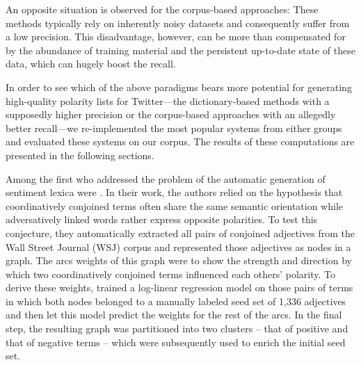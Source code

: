 An opposite situation is observed for the corpus-based approaches:
These methods typically rely on inherently noisy datasets and
consequently suffer from a low precision.  This disadvantage, however,
can be more than compensated for by the abundance of training material
and the persistent up-to-date state of these data, which can hugely
boost the recall.

In order to see which of the above paradigms bears more potential for
generating high-quality polarity lists for Twitter---the
dictionary-based methods with a supposedly higher precision or the
corpus-based approaches with an allegedly better recall---we
re-implemented the most popular systems from either groups and
evaluated these systems on our corpus.  The results of these
computations are presented in the following sections.

Among the first who addressed the problem of the automatic generation
of sentiment lexica were \citet{Hatzivassi:97}.  In their work, the
authors relied on the hypothesis that coordinatively conjoined terms
often share the same semantic orientation while adversatively linked
words rather express opposite polarities.  To test this conjecture,
they automatically extracted all pairs of conjoined adjectives from
the Wall Street Journal (WSJ) corpus and represented those adjectives
as nodes in a graph.  The arcs weights of this graph were to show the
strength and direction by which two coordinatively conjoined terms
influenced each others' polarity.  To derive these weights,
\citeauthor{Hatzivassi:97} trained a log-linear regression model on
those pairs of terms in which both nodes belonged to a manually
labeled seed set of 1,336 adjectives and then let this model predict
the weights for the rest of the arcs.  In the final step, the
resulting graph was partitioned into two clusters -- that of positive
and that of negative terms -- which were subsequently used to enrich
the initial seed set.

